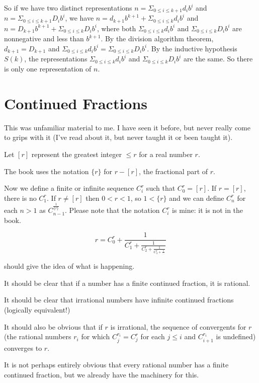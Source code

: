 \documentclass[12pt]{article}
\begin{document}
So if we have two distinct representations $n=\Sigma_{0 \leq i \leq k+1}d_ib^i$ and $n=\Sigma_{0 \leq i \leq k+1}D_ib^i$,
we have $n = d_{k+1}b^{k+1} + \Sigma_{0 \leq i \leq k}d_ib^i$ and $n = D_{k+1}b^{k+1} + \Sigma_{0 \leq i \leq k}D_ib^i$, where both $\Sigma_{0 \leq i \leq k}d_ib^i$ and $\Sigma_{0 \leq i \leq k}D_ib^i$ are nonnegative and less
than $b^{k+1}$.  By the division algorithm theorem, $d_{k+1} = D_{k+1}$ and $\Sigma_{0 \leq i \leq k}d_ib^i = \Sigma_{0 \leq i \leq k}D_ib^i$.  By the inductive hypothesis $S(k)$, the representations $\Sigma_{0 \leq i \leq k}d_ib^i$ and $\Sigma_{0 \leq i \leq k}D_ib^i$ are the same.  So there is only one representation of $n$.

\section{Continued Fractions}

This was unfamiliar material to me.  I have seen it before, but never really come to grips with it (I've read about it, but never taught it or been taught it).

Let $[r]$ represent the greatest integer $\leq r$ for a real number $r$.

The book uses the notation $\{r\}$ for $r-[r]$, the fractional part of $r$.

Now we define a finite or infinite sequence $C^r_i$ such that $C^r_0 = [r]$.  If $r=[r]$, there is no $C^r_1$.  If $r \neq [r]$ then $0 < r < 1$, so $1 < \{r\}$ and we can define
$C^r_n$ for each $n>1$ as $C^{\frac 1{\{r\}}}_{n-1}$.  Please note that the notation $C^r_i$ is mine:  it is not in the book.

$$r = C^r_0 +\frac1{C^r_1 +\frac1{C^r_2 +\frac1{C^r_3 +\frac1{\ldots}}}}$$

should give the idea of what is happening.

It should be clear that if a number has a finite continued fraction, it is rational.

It should be clear that irrational numbers have infinite continued fractions (logically equivalent!)

It should also be obvious that if $r$ is irrational, the sequence of convergents for $r$ (the rational numbers $r_i$ for which $C^{r_i}_j = C^{r}_j$ for each $j\leq i$ and
$C^{r_i}_{i+1}$ is undefined) converges to $r$.

It is not perhaps entirely obvious that every rational number has a finite continued fraction, but we already have the machinery for this.
\end{document}
